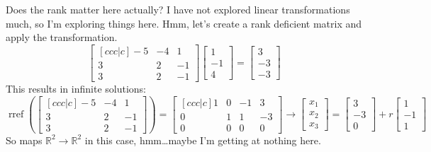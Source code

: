 \documentclass[basic]{inVerba-notes}
\begin{document}
\begin{enumerate}[align=left, leftmargin=0pt, labelindent=\parindent, listparindent=\parindent, labelwidth=0pt, itemindent=!]
  Does the rank matter here actually? I have not explored linear transformations much, so I'm exploring things here. Hmm, let's create a rank deficient matrix and apply the transformation.
  \[%
  \begin{bmatrix}[ccc|c]
    -5 & -4 & 1 \\
    3 & 2 & -1  \\
    3 & 2 & -1  
  \end{bmatrix} 
  \begin{bmatrix} 1 \\ -1 \\ 4 \end{bmatrix} =
  \begin{bmatrix} 3 \\ -3 \\ -3 \end{bmatrix}
  \]%
  This results in infinite solutions:
  \[%
  \operatorname{rref}\left(\begin{bmatrix}[ccc|c]
    -5 & -4 & 1 \\
    3 & 2 & -1  \\
    3 & 2 & -1  
  \end{bmatrix}\right)
  =
  \begin{bmatrix}[ccc|c]
    1 & 0 & -1 & 3 \\
    0 & 1 & 1 & -3 \\
    0 & 0 & 0 & 0 
  \end{bmatrix} 
  \to 
  \begin{bmatrix} x_1 \\ x_2 \\ x_3 \end{bmatrix} = 
  \begin{bmatrix} 3 \\ -3 \\ 0 \end{bmatrix} + r
  \begin{bmatrix} 1 \\ -1 \\ 1 \end{bmatrix}
  \]%
  So  maps \(\mathbb{R}^2 \to \mathbb{R}^2\) in this case, hmm\dots maybe I'm getting at nothing here. 

\end{enumerate}
\end{document}
